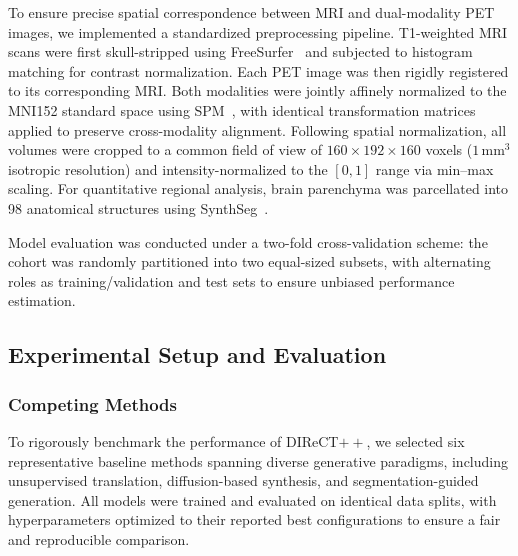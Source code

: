 \documentclass{article}
\begin{document}
To ensure precise spatial correspondence between MRI and dual-modality PET images, we implemented a standardized preprocessing pipeline. T1-weighted MRI scans were first skull-stripped using FreeSurfer~\cite{Freesurfer} and subjected to histogram matching for contrast normalization. Each PET image was then rigidly registered to its corresponding MRI. Both modalities were jointly affinely normalized to the MNI152 standard space using SPM~\cite{spm}, with identical transformation matrices applied to preserve cross-modality alignment. Following spatial normalization, all volumes were cropped to a common field of view of $160 \times 192 \times 160$ voxels ($1\,\text{mm}^3$ isotropic resolution) and intensity-normalized to the $[0, 1]$ range via min–max scaling. For quantitative regional analysis, brain parenchyma was parcellated into 98 anatomical structures using SynthSeg~\cite{synthseg}.

Model evaluation was conducted under a two-fold cross-validation scheme: the cohort was randomly partitioned into two equal-sized subsets, with alternating roles as training/validation and test sets to ensure unbiased performance estimation.

\subsection{Experimental Setup and Evaluation}
\subsubsection{Competing Methods}
To rigorously benchmark the performance of DIReCT$++$, we selected six representative baseline methods spanning diverse generative paradigms, including unsupervised translation, diffusion-based synthesis, and segmentation-guided generation. All models were trained and evaluated on identical data splits, with hyperparameters optimized to their reported best configurations to ensure a fair and reproducible comparison.
\end{document}
